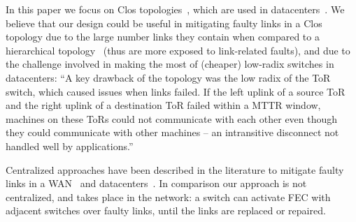 In this paper we focus on Clos
topologies~\cite{clos_bstj1953}, 
which are used in datacenters~\cite{Singh:2016:JRD:2991470.2975159}.
We believe that our design could be useful in mitigating faulty links in a Clos
topology due to the large number links they contain when compared to a
hierarchical topology~\cite{Al-Fares:2008:SCD:1402946.1402967} (thus are more exposed to link-related faults), and due
to the challenge involved in making the most of (cheaper) low-radix switches in datacenters:
``A key drawback of the topology was the low radix of
the ToR switch, which caused issues when links failed.
If the left uplink of a source ToR and the right uplink
of  a  destination  ToR  failed  within  a  MTTR  window,
machines  on  these  ToRs  could  not  communicate  with
each other even though they could communicate with
other machines -- an intransitive disconnect not handled
well by applications.''~\cite[\S3.1]{Singh:2016:JRD:2991470.2975159}

Centralized approaches have been described in the literature to mitigate
faulty links in a WAN~\cite{traffic-engineering-with-forward-fault-correction}
and datacenters~\cite{Zhuo:2017:UMP:3098822.3098849}. In comparison our approach
is not centralized, and takes place in the network: a switch can activate
FEC with adjacent switches over faulty links, until the links are replaced or
repaired.
